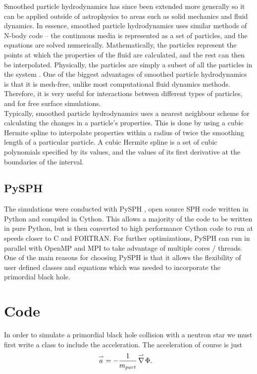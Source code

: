 Smoothed particle hydrodynamics has since been extended more generally so it can be applied outside of astrophysics to areas such as solid mechanics and fluid dynamics. In essence, smoothed particle hydrodynamics uses similar methods of N-body code -- the continuous media is represented as a set of particles, and the equations are solved numerically. Mathematically, the particles represent the points at which the properties of the fluid are calculated, and the rest can then be interpolated. Physically, the particles are simply a subset of all the particles in the system \cite{newsph}. One of the biggest advantages of smoothed particle hydrodynamics is that it is mesh-free, unlike most computational fluid dynamics methods. Therefore, it is very useful for interactions between different types of particles, and for free surface simulations. \\

Typically, smoothed particle hydrodynamics uses a nearest neighbour scheme for calculating the changes in a particle's properties. This is done by using a cubic Hermite spline to interpolate properties within a radius of twice the smoothing length of a particular particle. A cubic Hermite spline is a set of cubic polynomials specified by its values, and the values of its first derivative at the boundaries of the interval.

\subsection{PySPH}
The simulations were conducted with PySPH \cite{pysph}, open source SPH code written in Python and compiled in Cython. This allows a majority of the code to be written in pure Python, but is then converted to high performance Cython code to run at speeds closer to C and FORTRAN. For further optimizations, PySPH can run in parallel with OpenMP and MPI to take advantage of multiple cores / threads. One of the main reasons for choosing PySPH is that it allows the flexibility of user defined classes and equations which was needed to incorporate the primordial black hole.

\section{Code}

In order to simulate a primordial black hole collision with a neutron star we must first write a class to include the acceleration. The acceleration of course is just
\begin{align*}
\overset{\rightharpoonup}a &= - \frac{1}{m_{part}} \operatorname{\overset{\rightharpoonup}\nabla} \Phi.
\end{align*}

